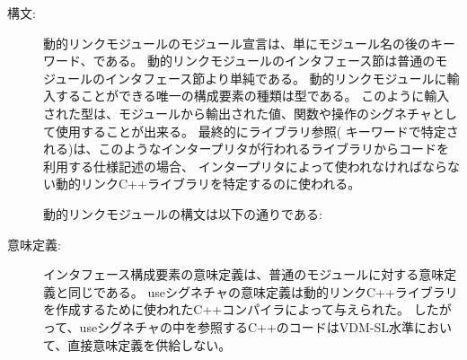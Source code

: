 \documentclass[\pformat,12pt]{jarticle}
\begin{document}
\begin{description}
\item[構文:]

動的リンクモジュールのモジュール宣言は、単にモジュール名の後のキーワード、である。
動的リンクモジュールのインタフェース節は普通のモジュールのインタフェース節より単純である。
動的リンクモジュールに輸入することができる唯一の構成要素の種類は型である。
このように輸入された型は、モジュールから輸出された値、関数や操作のシグネチャとして使用することが出来る。
最終的にライブラリ参照( キーワードで特定される)は、このようなインタープリタが行われるライブラリからコードを利用する仕様記述の場合、
インタープリタによって使われなければならない動的リンクC++ライブラリを特定するのに使われる。

動的リンクモジュールの構文は以下の通りである:
 





  

  
\item[意味定義:] インタフェース構成要素の意味定義は、普通のモジュールに対する意味定義と同じである。
     useシグネチャの意味定義は動的リンクC++ライブラリを作成するために使われたC++コンパイラによって与えられた。
	 したがって、useシグネチャの中を参照するC++のコードはVDM-SL水準において、直接意味定義を供給しない。


\end{description}
\end{document}
